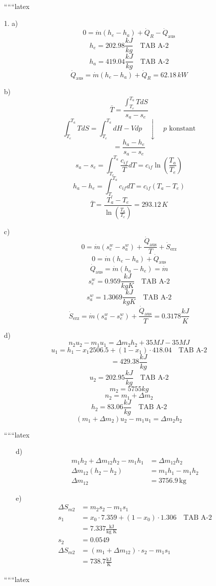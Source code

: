 
``````latex

1. a) 
\[
0 = \dot{m}(h_e - h_a) + \dot{Q}_R - \dot{Q}_{\text{aus}}
\]
\[
h_e = 202.98 \frac{kJ}{kg} \quad \text{TAB A-2}
\]
\[
h_a = 419.04 \frac{kJ}{kg} \quad \text{TAB A-2}
\]
\[
\dot{Q}_{\text{aus}} = \dot{m}(h_e - h_a) + \dot{Q}_R = 62.18 \, kW
\]

b) 
\[
\bar{T} = \frac{\int_{T_e}^{T_a} T dS}{s_a - s_e}
\]
\[
\int_{T_e}^{T_a} T dS = \int_{T_e}^{T_a} dH - V dp \quad \downarrow \quad p \text{ konstant}
\]
\[
= \frac{h_a - h_e}{s_a - s_e}
\]
\[
s_a - s_e = \int_{T_e}^{T_a} \frac{c_{if}}{T} dT = c_{if} \ln \left( \frac{T_a}{T_e} \right)
\]
\[
h_a - h_e = \int_{T_e}^{T_a} c_{if} dT = c_{if} (T_a - T_e)
\]
\[
\bar{T} = \frac{T_a - T_e}{\ln \left( \frac{T_a}{T_e} \right)} = 293.12 \, K
\]

c) 
\[
0 = \dot{m}(s_e^w - s_a^w) + \frac{\dot{Q}_{\text{aus}}}{T} + \dot{S}_{\text{erz}}
\]
\[
0 = \dot{m}(h_e - h_a) + \dot{Q}_{\text{aus}}
\]
\[
\dot{Q}_{\text{aus}} = \dot{m}(h_a - h_e) = \dot{m}
\]
\[
s_e^w = 0.959 \frac{kJ}{kgK} \quad \text{TAB A-2}
\]
\[
s_a^w = 1.3069 \frac{kJ}{kgK} \quad \text{TAB A-2}
\]
\[
\dot{S}_{\text{erz}} = \dot{m}(s_a^w - s_e^w) + \frac{\dot{Q}_{\text{aus}}}{T} = 0.3178 \frac{kJ}{K}
\]

d) 
\[
n_2 u_2 - m_1 u_1 = \Delta m_2 h_2 + 35 MJ - 35 MJ
\]
\[
u_1 = h_1 - x_1 2506.5 + (1 - x_1) \cdot 418.04 \quad \text{TAB A-2}
\]
\[
= 429.38 \frac{kJ}{kg}
\]
\[
u_2 = 202.95 \frac{kJ}{kg} \quad \text{TAB A-2}
\]
\[
m_2 = 5755 kg
\]
\[
n_2 = m_1 + \Delta m_2
\]
\[
h_2 = 83.06 \frac{kJ}{kg} \quad \text{TAB A-2}
\]
\[
(m_1 + \Delta m_2) u_2 - m_1 u_1 = \Delta m_2 h_2
\]

``````latex

\begin{itemize}
    \item[d)] 
    \begin{align*}
        m_1 h_2 + \Delta m_{12} h_2 - m_1 h_1 &= \Delta m_{12} h_2 \\
        \Delta m_{12} (h_2 - h_2) &= m_1 h_1 - m_1 h_2 \\
        \Delta m_{12} &= 3756.9 \, \text{kg}
    \end{align*}
    
    \item[e)] 
    \begin{align*}
        \Delta S_{m2} &= m_2 s_2 - m_1 s_1 \\
        s_1 &= x_0 \cdot 7.359 + (1 - x_0) \cdot 1.306 \quad \text{TAB A-2} \\
        &= 7.337 \frac{\text{kJ}}{\text{kg K}} \\
        s_2 &= 0.0549 \\
        \Delta S_{m2} &= (m_1 + \Delta m_{12}) \cdot s_2 - m_1 s_1 \\
        &= 738.7 \frac{\text{kJ}}{\text{K}}
    \end{align*}
\end{itemize}

``````latex


